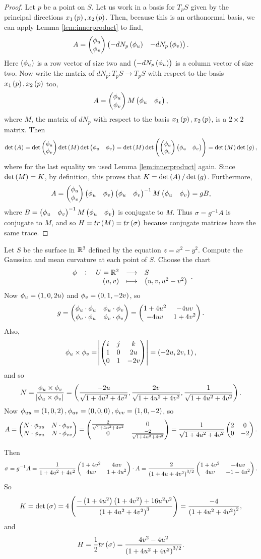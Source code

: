 \begin{proof}
Let $ p $ be a point on $ S $. Let us work in a basis for $ T_pS $ given by the principal directions $ x_1\br{p}, x_2\br{p} $. Then, because this is an orthonormal basis, we can apply Lemma \ref{lem:innerproduct} to find,
$$ A = \twobyone{\phi_u}{\phi_v}\onebytwo{-dN_p\br{\phi_u}}{-dN_p\br{\phi_v}}. $$
Here $ \br{\phi_u} $ is a row vector of size two and $ \br{-dN_p\br{\phi_u}} $ is a column vector of size two. Now write the matrix of $ dN_p : T_pS \to T_pS $ with respect to the basis $ x_1\br{p}, x_2\br{p} $ too,
$$ A = \begin{pmatrix} \phi_u \\ \phi_v \end{pmatrix}M\begin{pmatrix} \phi_u & \phi_v \end{pmatrix}, $$
where $ M $, the matrix of $ dN_p $ with respect to the basis $ x_1\br{p}, x_2\br{p} $, is a $ 2 \times 2 $ matrix. Then
$$ \det\br{A} = \det\twobyone{\phi_u}{\phi_v}\det\br{M}\det\onebytwo{\phi_u}{\phi_v} = \det\br{M}\det\br{\twobyone{\phi_u}{\phi_v}\onebytwo{\phi_u}{\phi_v}} = \det\br{M}\det\br{g}, $$
where for the last equality we used Lemma \ref{lem:innerproduct} again. Since $ \det\br{M} = K $, by definition, this proves that $ K = \det\br{A} / \det\br{g} $. Furthermore,
$$ A = \begin{pmatrix} \phi_u \\ \phi_v \end{pmatrix}\begin{pmatrix} \phi_u & \phi_v \end{pmatrix}\begin{pmatrix} \phi_u & \phi_v \end{pmatrix}^{-1}M\begin{pmatrix} \phi_u & \phi_v \end{pmatrix} = gB, $$
where $ B = \begin{pmatrix} \phi_u & \phi_v \end{pmatrix}^{-1}M\begin{pmatrix} \phi_u & \phi_v \end{pmatrix} $ is conjugate to $ M $. Thus $ \sigma = g^{-1}A $ is conjugate to $ M $, and so $ H = tr\br{M} = tr\br{\sigma} $ because conjugate matrices have the same trace.
\end{proof}


\begin{example*}
Let $ S $ be the surface in $ \mathbb{R}^3 $ defined by the equation $ z = x^2 - y^2 $. Compute the Gaussian and mean curvature at each point of $ S $. Choose the chart
$$ \function[\phi]{U = \R^2}{S}{\br{u, v}}{\br{u, v, u^2 - v^2}}. $$
Now $ \phi_u = \br{1, 0, 2u} $ and $ \phi_v = \br{0, 1, -2v} $, so
$$ g = \begin{pmatrix} \phi_u \cdot \phi_u & \phi_u \cdot \phi_v \\ \phi_v \cdot \phi_u & \phi_v \cdot \phi_v \end{pmatrix} = \begin{pmatrix} 1 + 4u^2 & -4uv \\ -4uv & 1 + 4v^2 \end{pmatrix}. $$
Also,
$$ \phi_u \times \phi_v = \abs{\threebythree{i}{j}{k}{1}{0}{2u}{0}{1}{-2v}} = \br{-2u, 2v, 1}, $$
and so
$$ N = \dfrac{\phi_u \times \phi_v}{\abs{\phi_u \times \phi_v}} = \br{\dfrac{-2u}{\sqrt{1 + 4u^2 + 4v^2}}, \dfrac{2v}{\sqrt{1 + 4u^2 + 4v^2}}, \dfrac{1}{\sqrt{1 + 4u^2 + 4v^2}}}. $$
Now $ \phi_{uu} = \br{1, 0, 2}, \phi_{uv} = \br{0, 0, 0}, \phi_{vv} = \br{1, 0, -2} $, so
$$ A = \begin{pmatrix} N \cdot \phi_{uu} & N \cdot \phi_{uv} \\ N \cdot \phi_{vu} & N \cdot \phi_{vv} \end{pmatrix} = \begin{pmatrix} \tfrac{2}{\sqrt{1 + 4u^2 + 4v^2}} & 0 \\ 0 & \tfrac{-2}{\sqrt{1 + 4u^2 + 4v^2}} \end{pmatrix} = \dfrac{1}{\sqrt{1 + 4u^2 + 4v^2}}\begin{pmatrix} 2 & 0 \\ 0 & -2 \end{pmatrix}. $$

Then
$$ \sigma = g^{-1}A = \dfrac{1}{1 + 4u^2 + 4v^2}\twobytwo{1 + 4v^2}{4uv}{4uv}{1 + 4u^2} \cdot A = \dfrac{2}{\br{1 + 4u + 4v^2}^{3 / 2}}\twobytwo{1 + 4v^2}{-4uv}{4uv}{-1 - 4u^2}. $$
So
$$ K = \det\br{\sigma} = 4\br{\dfrac{-\br{1 + 4u^2}\br{1 + 4v^2} + 16u^2v^2}{\br{1 + 4u^2 + 4v^2}^3}} = \dfrac{-4}{\br{1 + 4u^2 + 4v^2}^2}, $$
and
$$ H = \dfrac{1}{2}tr\br{\sigma} = \dfrac{4v^2 - 4u^2}{\br{1 + 4u^2 + 4v^2}^{3 / 2}}. $$
\end{example*}

